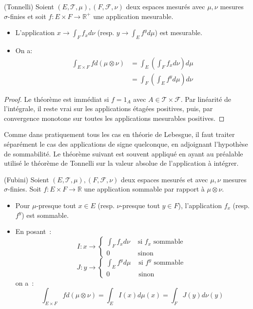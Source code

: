 \begin{mandatory}
\begin{theorem}(Tonnelli)
Soient $(E, \mathcal{T}, \mu), (F, \mathcal{F}, \nu)$ deux espaces
mesurés avec $\mu, \nu$ mesures $\sigma$-finies et soit $f : E \times F \to \mathbb{R}^+$ une application
mesurable. 
\begin{itemize}
\item L'application $x \to  \int_F f_x d \nu $ (resp. $y \to
\int_E f^y d \mu$) est mesurable.
\item On a:
 \begin{align*}
\int_{E \times F} f d( \mu \otimes \nu) & = \int_E \left (
\int_F f_x d \nu \right ) d \mu \\
& = \int_F \left (
\int_E f^y d \mu \right ) d \nu
\end{align*}
\end{itemize}
\end{theorem}
\end{mandatory}
\begin{proof}
Le théorème est immédiat si $f = 1_A$ avec $A \in \mathcal{T} \times
\mathcal{F}$. Par linéarité de l'intégrale, il reste vrai sur les
applications étagées positives, puis, par convergence monotone sur
toutes les applications mesurables positives.
\end{proof}
Comme dans pratiquement tous les cas en théorie de Lebesgue, il faut traiter
séparément le cas des applications de signe quelconque, en adjoignant
l'hypothèse de sommabilité. Le théorème suivant est souvent appliqué en ayant au
préalable utilisé le théorème de Tonnelli sur la valeur absolue de l'application
à intégrer.
\begin{mandatory}
\begin{theorem}(Fubini)
Soient $(E, \mathcal{T}, \mu), (F, \mathcal{F}, \nu)$ deux espaces
mesurés et avec $\mu,\nu$ mesures $\sigma$-finies. Soit $f : E \times F \to
\mathbb{R}$ une application sommable par rapport à $\mu \otimes \nu$.
\begin{itemize}
\item Pour $\mu$-presque tout $x\in E $ (resp. $\nu$-presque tout $y
\in  F$), l'application $f_x$ (resp. $f^y$) est sommable.
\item En posant~:
\[
I : x \to \left \{
\begin{array}{cc}
\int_F f_x d \nu & \mbox { si } f_x \mbox { sommable } \\
0 & \mbox{ sinon }
\end{array}
\right .
\]
\[
J : y \to \left \{
\begin{array}{cc}
\int_E f^y d \mu & \mbox { si } f^y \mbox { sommable } \\
0 & \mbox{ sinon }
\end{array}
\right .
\]
on a~:
\[
\int_{E \times F} f d (\mu \otimes \nu) = \int_E I(x) d \mu(x) = \int_F J(y)
d \nu(y)
\]
\end{itemize}
\end{theorem}
\end{mandatory}
